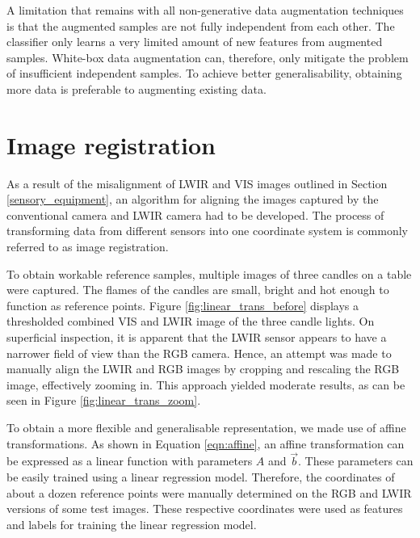 \documentclass{l4proj}
\begin{document}
A limitation that remains with all non-generative data augmentation techniques is that the augmented samples are not fully independent from each other. The classifier only learns a very limited amount of new features from augmented samples. White-box data augmentation can, therefore, only mitigate the problem of insufficient independent samples. To achieve better generalisability, obtaining more data is preferable to augmenting existing data.


\section{Image registration}
\label{image_registration}

As a result of the misalignment of LWIR and VIS images outlined in Section \ref{sensory_equipment}, an algorithm for aligning the images captured by the conventional camera and LWIR camera had to be developed. The process of transforming data from different sensors into one coordinate system is commonly referred to as image registration.

To obtain workable reference samples, multiple images of three candles on a table were captured. The flames of the candles are small, bright and hot enough to function as reference points. Figure \ref{fig:linear_trans_before} displays a thresholded combined VIS and LWIR image of the three candle lights. On superficial inspection, it is apparent that the LWIR sensor appears to have a narrower field of view than the RGB camera. Hence, an attempt was made to manually align the LWIR and RGB images by cropping and rescaling the RGB image, effectively zooming in. This approach yielded moderate results, as can be seen in Figure \ref{fig:linear_trans_zoom}.

To obtain a more flexible and generalisable representation, we made use of affine transformations. As shown in Equation \ref{eqn:affine}, an affine transformation can be expressed as a linear function with parameters $A$ and $\vec{b}$. These parameters can be easily trained using a linear regression model. Therefore, the coordinates of about a dozen reference points were manually determined on the RGB and LWIR versions of some test images. These respective coordinates were used as features and labels for training the linear regression model. 
\end{document}
